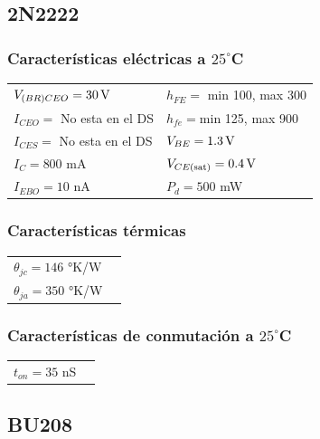 \documentclass[chaptersright]{informeutn}
\begin{document}
  \subsection{2N2222}
    
    \subsubsection{Características eléctricas a $25^\circ$C}
    \begin{tabular}{ll}
    $V_{(BR)CEO} =  30 \,\mathrm{V}$         & \hspace{2cm} $h_{FE} =$ min 100, max 300 \\
    $I_{CEO} = $ No esta en el DS           & \hspace{2cm} $h_{fe} = $min 125, max 900 \\
    $I_{CES} = $ No esta en el DS               & \hspace{2cm} $V_{BE} = 1.3 \,\mathrm{V} $ \\
    $I_C = 800$ mA                & \hspace{2cm} $V_{CE(\text{sat})} =0.4 \,\mathrm{V} $ \\
    $I_{EBO} = 10$ nA              & \hspace{2cm} $P_d = 500$ mW \\
    \end{tabular}
    
    \subsubsection{Características térmicas}
    \begin{tabular}{ll}
    $\theta_{jc} = 146$ °K/W \\
    $\theta_{ja} = 350$ °K/W\\
    \end{tabular}
    
    \subsubsection{Características de conmutación a $25^\circ$C}
    \begin{tabular}{ll}
    $t_{on} = 35$ nS \\
    \end{tabular}

  \subsection{BU208}
\end{document}

